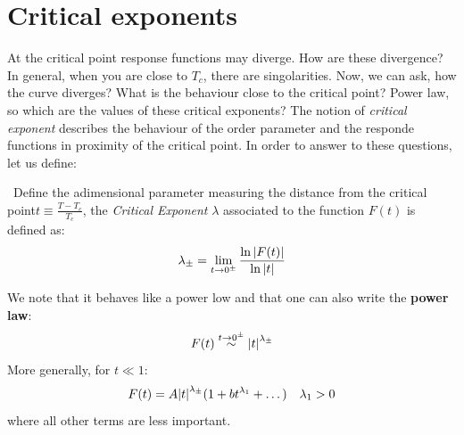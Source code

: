 \documentclass[../main/main.tex]{subfiles}
\begin{document}
\section{Critical exponents}
At the critical point response functions may diverge. How are these divergence?
In general, when you are close to \( T_c \), there are singolarities. Now, we can ask, how the curve diverges? What is the behaviour close to the critical point? Power law, so which are the values of these critical exponents? The notion of \emph{critical exponent} describes the behaviour of the order parameter and the responde functions in proximity of the critical point.
In order to answer to these questions, let us define:

\begin{bluebox}
\begin{definition} \
Define the adimensional parameter measuring the distance from the critical point\( t \equiv \frac{T-T_c}{T_c} \), the \emph{Critical Exponent} \( \lambda  \) associated to the function \( F(t) \) is defined as:
\begin{equation}
  \lambda _{\pm} = \lim_{t \rightarrow 0^{\pm}} \frac{\ln{\abs{F(t)} } }{\ln{\abs{t} } }
  \label{eq:}
\end{equation}
\end{definition}
\end{bluebox}
We note that it behaves like a power low and that one can also write the \textbf{power law}:
\begin{equation}
  F(t) \overset{t \rightarrow  0^{\pm}}{\sim } \abs{t}^{\lambda _{\pm}}
  \label{eq:}
\end{equation}
More generally, for \( t \ll 1 \):
\begin{equation}
  F(t) = A \abs{t}^{\lambda _{\pm}} ( 1 + bt^{\lambda _1}+ \dots) \quad \lambda _1 > 0
  \label{eq:}
\end{equation}
where all other terms are less important.
\end{document}
